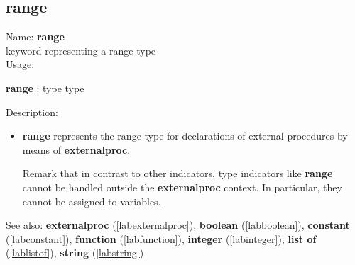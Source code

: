 \subsection{range}
\label{labrange}
\noindent Name: \textbf{range}\\
keyword representing a \textsf{range} type \\
\noindent Usage: 
\begin{center}
\textbf{range} : \textsf{type type}
\\ 
\end{center}
\noindent Description: \begin{itemize}

\item \textbf{range} represents the \textsf{range} type for declarations
   of external procedures by means of \textbf{externalproc}.
    
   Remark that in contrast to other indicators, type indicators like
   \textbf{range} cannot be handled outside the \textbf{externalproc} context.  In
   particular, they cannot be assigned to variables.
\end{itemize}
See also: \textbf{externalproc} (\ref{labexternalproc}), \textbf{boolean} (\ref{labboolean}), \textbf{constant} (\ref{labconstant}), \textbf{function} (\ref{labfunction}), \textbf{integer} (\ref{labinteger}), \textbf{list of} (\ref{lablistof}), \textbf{string} (\ref{labstring})
